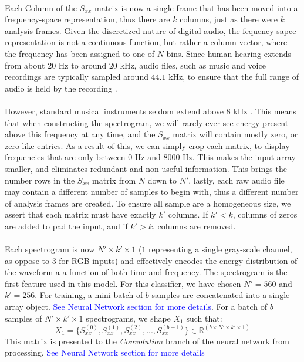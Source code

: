 \documentclass[12pt,letterpaper]{article}
\begin{document}
\paragraph*{}Each Column of the $S_{xx}$ matrix is now a single-frame that has been moved into a frequency-space representation, thus there are $k$ columns, just as there were $k$ analysis frames. Given the discretized nature of digital audio, the fequency-sapce representation is not a continuous function, but rather a column vector, where the frequency has been assigned to one of $N$ bins. Since human hearing extends from about $20$ Hz to around $20$ kHz, audio files, such as music and voice recordings are typically sampled around $44.1$ kHz, to ensure that the full range of audio is held by the recording \cite{Olson,Virtanen}. 

\paragraph*{}However, standard musical instruments seldom extend above $8$ kHz \cite{Olson,Virtanen,White}. This means that when constructing the spectrogram, we will rarely ever see energy present above this frequency at any time, and the $S_{xx}$ matrix will contain mostly zero, or zero-like entries. As a result of this, we can simply crop each matrix, to display frequencies that are only between $0$ Hz and $8000$ Hz. This makes the input array smaller, and eliminates redundant and non-useful information. This brings the number rows in the $S_{xx}$ matrix from $N$ down to $N'$. lastly, each raw audio file may contain a different number of samples to begin with, thus a different number of analysis frames are created. To ensure all sample are a homogeneous size, we assert that each matrix must have exactly $k'$ columns. If $k' < k$, columns of zeros are added to pad the input, and if $k' > k$, columns are removed.

\paragraph*{}Each spectrogram is now $N' \times k' \times 1$ ($1$ representing a single gray-scale channel, as oppose to $3$ for RGB inputs) and effectively encodes the energy distribution of the waveform a a function of both time and frequency. The spectrogram is the first feature used in this model. For this classifier, we have chosen $N' = 560$ and $k' = 256$. For training, a mini-batch of $b$ samples are concatenated into a single array object. \textcolor{blue}{See Neural Network section for more details}. For a batch of $b$ samples of $N' \times k' \times 1$ spectrograms, we shape $X_1$ such that:
\begin{equation}
\label{eqn-X1 shape}
X_1 = \big\{ S_{xx}^{(0)},S_{xx}^{(1)},S_{xx}^{(2)}, ... , S_{xx}^{(b-1)} \big\} \in \mathbb{R}^{(b \times N' \times k' \times 1)}
\end{equation}
This matrix is presented to the \textit{Convolution} branch of the neural network from processing. \textcolor{blue}{See Neural Network section for more details}
\end{document}
